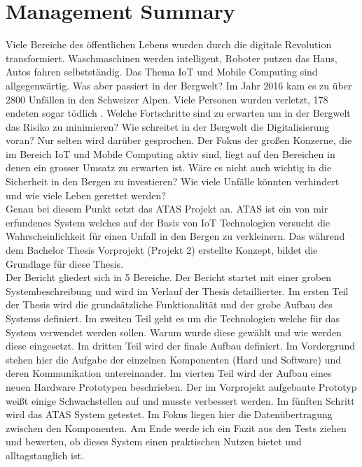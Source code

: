 \documentclass[11pt,english,german]{report}
\theoremstyle{definition}
\begin{document}
\tableofcontents

\chapter*{Management Summary}
Viele Bereiche des öffentlichen Lebens wurden durch die digitale Revolution transformiert. Waschmaschinen werden intelligent, Roboter putzen das Haus, Autos fahren selbstständig. Das Thema IoT und Mobile Computing sind allgegenwärtig. Was aber passiert in der Bergwelt? Im Jahr 2016 kam es zu über 2800 Unfällen in den Schweizer Alpen. Viele Personen wurden verletzt, 178 endeten sogar tödlich \cite{sacaccident}. Welche Fortschritte sind zu erwarten um in der Bergwelt das Risiko zu minimieren? Wie schreitet in der Bergwelt die Digitalisierung voran? Nur selten wird darüber gesprochen. Der Fokus der großen Konzerne, die im Bereich IoT und Mobile Computing aktiv sind, liegt auf den Bereichen in denen ein grosser Umsatz zu erwarten ist. Wäre es nicht auch wichtig in die Sicherheit in den Bergen zu investieren? Wie viele Unfälle könnten verhindert und wie viele Leben gerettet werden?\\[0.3cm]
Genau bei diesem Punkt setzt das \gls{ATAS} Projekt an. ATAS ist ein von mir erfundenes System welches auf der Basis von IoT Technologien versucht die Wahrscheinlichkeit für einen Unfall in den Bergen zu verkleinern. Das während dem Bachelor Thesis Vorprojekt (Projekt 2) erstellte Konzept, bildet die Grundlage für diese Thesis.\\[0.3cm] Der Bericht gliedert sich in 5 Bereiche. Der Bericht startet mit einer groben Systembeschreibung und wird im Verlauf der Thesis detaillierter. Im ersten Teil der Thesis wird die grundsätzliche Funktionalität und der grobe Aufbau des Systems definiert. Im zweiten Teil geht es um die Technologien welche für das System verwendet werden sollen. Warum wurde diese gewählt und wie werden diese eingesetzt. Im dritten Teil wird der finale Aufbau definiert. Im Vordergrund stehen hier die Aufgabe der einzelnen Komponenten (Hard und Software) und deren Kommunikation untereinander. Im vierten Teil wird der Aufbau eines neuen Hardware Prototypen beschrieben. Der im Vorprojekt aufgebaute Prototyp weißt einige Schwachstellen auf und musste verbessert werden. Im fünften Schritt wird das ATAS System getestet. Im Fokus liegen hier die Datenübertragung zwischen den Komponenten. Am Ende werde ich ein Fazit aus den Tests ziehen und bewerten, ob dieses System einen praktischen Nutzen bietet und alltagstauglich ist.
\end{document}
